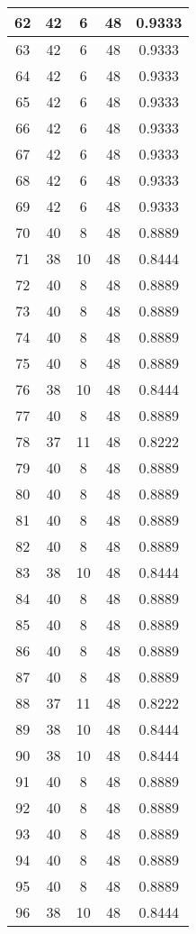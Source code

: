 \documentclass[letterpaper, 12pt]{article}
\begin{document}
\begin{longtable}{|c|c|c|c|c|}
\hline
62 & 42 & 6 & 48 & 0.9333 \\
\hline
63 & 42 & 6 & 48 & 0.9333 \\
\hline
64 & 42 & 6 & 48 & 0.9333 \\
\hline
65 & 42 & 6 & 48 & 0.9333 \\
\hline
66 & 42 & 6 & 48 & 0.9333 \\
\hline
67 & 42 & 6 & 48 & 0.9333 \\
\hline
68 & 42 & 6 & 48 & 0.9333 \\
\hline
69 & 42 & 6 & 48 & 0.9333 \\
\hline
70 & 40 & 8 & 48 & 0.8889 \\
\hline
71 & 38 & 10 & 48 & 0.8444 \\
\hline
72 & 40 & 8 & 48 & 0.8889 \\
\hline
73 & 40 & 8 & 48 & 0.8889 \\
\hline
74 & 40 & 8 & 48 & 0.8889 \\
\hline
75 & 40 & 8 & 48 & 0.8889 \\
\hline
76 & 38 & 10 & 48 & 0.8444 \\
\hline
77 & 40 & 8 & 48 & 0.8889 \\
\hline
78 & 37 & 11 & 48 & 0.8222 \\
\hline
79 & 40 & 8 & 48 & 0.8889 \\
\hline
80 & 40 & 8 & 48 & 0.8889 \\
\hline
81 & 40 & 8 & 48 & 0.8889 \\
\hline
82 & 40 & 8 & 48 & 0.8889 \\
\hline
83 & 38 & 10 & 48 & 0.8444 \\
\hline
84 & 40 & 8 & 48 & 0.8889 \\
\hline
85 & 40 & 8 & 48 & 0.8889 \\
\hline
86 & 40 & 8 & 48 & 0.8889 \\
\hline
87 & 40 & 8 & 48 & 0.8889 \\
\hline
88 & 37 & 11 & 48 & 0.8222 \\
\hline
89 & 38 & 10 & 48 & 0.8444 \\
\hline
90 & 38 & 10 & 48 & 0.8444 \\
\hline
91 & 40 & 8 & 48 & 0.8889 \\
\hline
92 & 40 & 8 & 48 & 0.8889 \\
\hline
93 & 40 & 8 & 48 & 0.8889 \\
\hline
94 & 40 & 8 & 48 & 0.8889 \\
\hline
95 & 40 & 8 & 48 & 0.8889 \\
\hline
96 & 38 & 10 & 48 & 0.8444 \\

\end{longtable}
\end{document}
